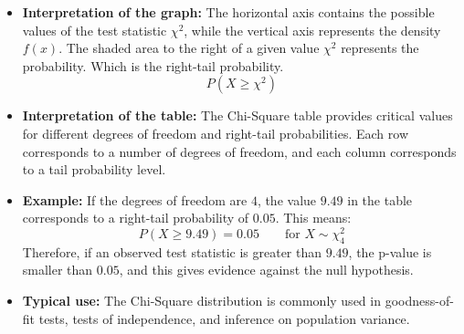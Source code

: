 \documentclass[11pt]{article}
\theoremstyle{smallexample}
\newcommand{\vs}{\vspace{0.2\baselineskip}}
\begin{document}
\begin{itemize}
    \item \textbf{Interpretation of the graph:} The horizontal axis contains the possible values of the test statistic \(\chi^2\), while the vertical axis represents the density \(f(x)\). The shaded area to the right of a given value \(\chi^2\) represents the probability.   Which is the right-tail probability.
    \[
    P(X \geq \chi^2)
    \]
  
\vs
    \item \textbf{Interpretation of the table:} The Chi-Square table provides critical values for different degrees of freedom and right-tail probabilities. Each row corresponds to a number of degrees of freedom, and each column corresponds to a tail probability level.

    \vs
    \item \textbf{Example:} If the degrees of freedom are \(4\), the value \(9.49\) in the table corresponds to a right-tail probability of \(0.05\). This means:
    \[
    P(X \geq 9.49)=0.05 \qquad \text{for } X \sim \chi^2_4
    \]
    Therefore, if an observed test statistic is greater than \(9.49\), the p-value is smaller than \(0.05\), and this gives evidence against the null hypothesis.

    \vs

    \item \textbf{Typical use:} The Chi-Square distribution is commonly used in goodness-of-fit tests, tests of independence, and inference on population variance.
\end{itemize}
\end{document}
